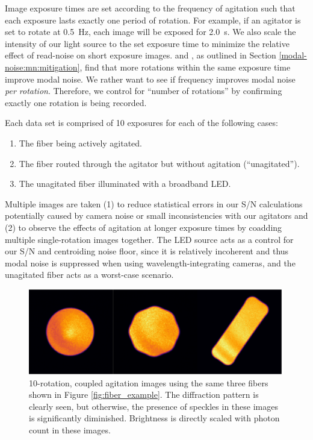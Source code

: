 Image exposure times are set according to the frequency of agitation such that each exposure lasts exactly one period of rotation. For example, if an agitator is set to rotate at \SI{0.5}{\hertz}, each image will be exposed for \SI{2.0}{\second}. We also scale the intensity of our light source to the set exposure time to minimize the relative effect of read-noise on short exposure images. \citet{baudrand_modal_2001} and \citet{lemke_modal_2011}, as outlined in Section \ref{modal-noise:mn:mitigation}, find that more rotations within the same exposure time improve modal noise. We rather want to see if frequency improves modal noise \textit{per rotation}. Therefore, we control for ``number of rotations'' by confirming exactly one rotation is being recorded.

Each data set is comprised of 10 exposures for each of the following cases:
\begin{enumerate}
\item The fiber being actively agitated.
\item The fiber routed through the agitator but without agitation (``unagitated'').
\item The unagitated fiber illuminated with a broadband LED.
\end{enumerate}
Multiple images are taken (1) to reduce statistical errors in our S/N calculations potentially caused by camera noise or small inconsistencies with our agitators and (2) to observe the effects of agitation at longer exposure times by coadding multiple single-rotation images together. The LED source acts as a control for our S/N and centroiding noise floor, since it is relatively incoherent and thus modal noise is suppressed when using wavelength-integrating cameras, and the unagitated fiber acts as a worst-case scenario.

\begin{figure}
\centering
	\includegraphics[width=\columnwidth]{figures-2/fiber_improved.pdf}
	\caption[Fiber faces with mitigated modal noise]{10-rotation, coupled agitation images using the same three fibers shown in Figure \ref{fig:fiber_example}.  The diffraction pattern is clearly seen, but otherwise, the presence of speckles in these images is significantly diminished. Brightness is directly scaled with photon count in these images.}
\label{fig:fiber_improved}
\end{figure}


